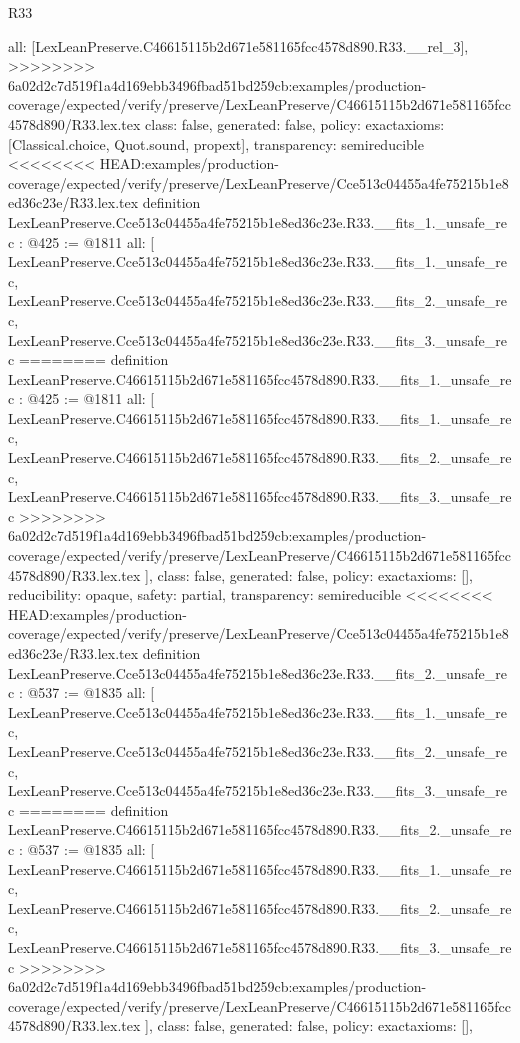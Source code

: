 \begin{lexlean}{R33}
\begin{coremodule}
{{{{{{{{{{{{{{{  all: [LexLeanPreserve.C46615115b2d671e581165fcc4578d890.R33.__rel_3],
>>>>>>>> 6a02d2c7d519f1a4d169ebb3496fbad51bd259cb:examples/production-coverage/expected/verify/preserve/LexLeanPreserve/C46615115b2d671e581165fcc4578d890/R33.lex.tex
  class: false,
  generated: false,
  policy: exact{axioms: [Classical.choice, Quot.sound, propext]},
  transparency: semireducible
}
<<<<<<<< HEAD:examples/production-coverage/expected/verify/preserve/LexLeanPreserve/Cce513c04455a4fe75215b1e8ed36c23e/R33.lex.tex
definition LexLeanPreserve.Cce513c04455a4fe75215b1e8ed36c23e.R33.__fits_1._unsafe_rec : @425 := @1811 {
  all: [
    LexLeanPreserve.Cce513c04455a4fe75215b1e8ed36c23e.R33.__fits_1._unsafe_rec,
    LexLeanPreserve.Cce513c04455a4fe75215b1e8ed36c23e.R33.__fits_2._unsafe_rec,
    LexLeanPreserve.Cce513c04455a4fe75215b1e8ed36c23e.R33.__fits_3._unsafe_rec
========
definition LexLeanPreserve.C46615115b2d671e581165fcc4578d890.R33.__fits_1._unsafe_rec : @425 := @1811 {
  all: [
    LexLeanPreserve.C46615115b2d671e581165fcc4578d890.R33.__fits_1._unsafe_rec,
    LexLeanPreserve.C46615115b2d671e581165fcc4578d890.R33.__fits_2._unsafe_rec,
    LexLeanPreserve.C46615115b2d671e581165fcc4578d890.R33.__fits_3._unsafe_rec
>>>>>>>> 6a02d2c7d519f1a4d169ebb3496fbad51bd259cb:examples/production-coverage/expected/verify/preserve/LexLeanPreserve/C46615115b2d671e581165fcc4578d890/R33.lex.tex
  ],
  class: false,
  generated: false,
  policy: exact{axioms: []},
  reducibility: opaque{},
  safety: partial,
  transparency: semireducible
}
<<<<<<<< HEAD:examples/production-coverage/expected/verify/preserve/LexLeanPreserve/Cce513c04455a4fe75215b1e8ed36c23e/R33.lex.tex
definition LexLeanPreserve.Cce513c04455a4fe75215b1e8ed36c23e.R33.__fits_2._unsafe_rec : @537 := @1835 {
  all: [
    LexLeanPreserve.Cce513c04455a4fe75215b1e8ed36c23e.R33.__fits_1._unsafe_rec,
    LexLeanPreserve.Cce513c04455a4fe75215b1e8ed36c23e.R33.__fits_2._unsafe_rec,
    LexLeanPreserve.Cce513c04455a4fe75215b1e8ed36c23e.R33.__fits_3._unsafe_rec
========
definition LexLeanPreserve.C46615115b2d671e581165fcc4578d890.R33.__fits_2._unsafe_rec : @537 := @1835 {
  all: [
    LexLeanPreserve.C46615115b2d671e581165fcc4578d890.R33.__fits_1._unsafe_rec,
    LexLeanPreserve.C46615115b2d671e581165fcc4578d890.R33.__fits_2._unsafe_rec,
    LexLeanPreserve.C46615115b2d671e581165fcc4578d890.R33.__fits_3._unsafe_rec
>>>>>>>> 6a02d2c7d519f1a4d169ebb3496fbad51bd259cb:examples/production-coverage/expected/verify/preserve/LexLeanPreserve/C46615115b2d671e581165fcc4578d890/R33.lex.tex
  ],
  class: false,
  generated: false,
  policy: exact{axioms: []},
}}}}}}}}}}}}}}}}}
\end{coremodule}
\end{lexlean}
